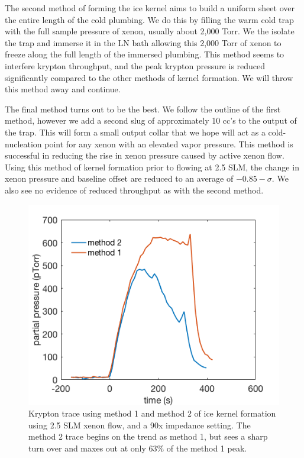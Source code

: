 \documentclass[12pt]{article}
\begin{document}
The second method of forming the ice kernel aims to build a uniform sheet over the entire length of the cold plumbing. We do this by filling the warm cold trap with the full sample pressure of xenon, usually about 2,000 Torr. We the isolate the trap and immerse it in the LN bath allowing this 2,000 Torr of xenon to freeze along the full length of the immersed plumbing. This method seems to interfere krypton throughput, and the peak krypton pressure is reduced significantly compared to the other methods of kernel formation. We will throw this method away and continue.

The final method turns out to be the best. We follow the outline of the first method, however we add a second slug of approximately 10 cc's to the output of the trap. This will form a small output collar that we hope will act as a cold-nucleation point for any xenon with an elevated vapor pressure. This method is successful in reducing the rise in xenon pressure caused by active xenon flow. Using this method of kernel formation prior to flowing at 2.5 SLM, the change in xenon pressure and baseline offset are reduced to an average of $-0.85-\sigma$. We also see no evidence of reduced throughput as with the second method.
\begin{figure}[h!]
\centering
\includegraphics[width=\textwidth]{Figures/ice_form_Krloss.png}
\caption{Krypton trace using method 1 and method 2 of ice kernel formation using 2.5 SLM xenon flow, and a 90x impedance setting. The method 2 trace begins on the trend as method 1, but sees a sharp turn over and maxes out at only 63\% of the method 1 peak. } 
\label{fig:iceformkrloss}
\end{figure} 
\end{document}
